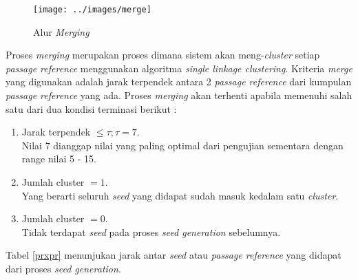 \documentclass[../Book.tex]{subfiles}
\begin{document}
	\begin{center}
		\begin{figure}[H]
			\texttt{[image: ../images/merge]}
			\caption{Alur \textit{Merging}}
			\label{fig:merge}
		\end{figure}
	\end{center}

	\noindent Proses \textit{merging} merupakan proses dimana sistem akan meng-\textit{cluster} setiap \textit{passage reference} menggunakan algoritma \textit{single linkage clustering}. Kriteria \textit{merge} yang digunakan adalah jarak terpendek antara 2 \textit{passage reference} dari kumpulan \textit{passage reference} yang ada. Proses \textit{merging} akan terhenti apabila memenuhi salah satu dari dua kondisi terminasi berikut : 
	
	\begin{enumerate}
		\item Jarak terpendek  $\leq \tau; \tau = 7$.\\
		Nilai 7 dianggap nilai yang paling optimal dari pengujian sementara dengan range nilai 5 - 15.
		\item Jumlah cluster $=1$. \\
		Yang berarti  seluruh \textit{seed} yang didapat sudah masuk kedalam satu \textit{cluster}.
		\item Jumlah cluster $=0$. \\
		Tidak terdapat \textit{seed} pada proses \textit{seed generation} sebelumnya.
		
	\end{enumerate} 
	
	\noindent Tabel \ref{prxpr} menunjukan jarak antar \textit{seed} atau \textit{passage reference} yang didapat dari proses \textit{seed generation}.
	
\end{document}
